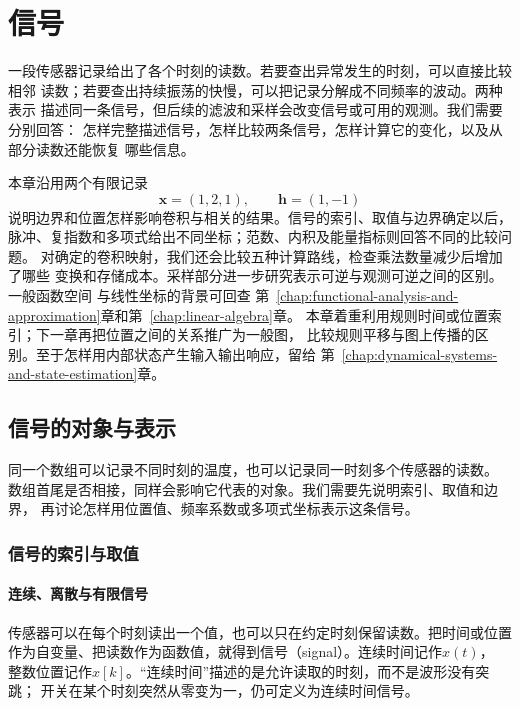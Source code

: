 \chapter{信号}
\label{chap:signal-analysis}

一段传感器记录给出了各个时刻的读数。若要查出异常发生的时刻，可以直接比较相邻
读数；若要查出持续振荡的快慢，可以把记录分解成不同频率的波动。两种表示
描述同一条信号，但后续的滤波和采样会改变信号或可用的观测。我们需要分别回答：
怎样完整描述信号，怎样比较两条信号，怎样计算它的变化，以及从部分读数还能恢复
哪些信息。

本章沿用两个有限记录
\begin{equation}
  \bm x=(1,2,1),\qquad \bm h=(1,-1)
  \label{eq:signal-analysis-running-example}
\end{equation}
说明边界和位置怎样影响卷积与相关的结果。信号的索引、取值与边界确定以后，
脉冲、复指数和多项式给出不同坐标；范数、内积及能量指标则回答不同的比较问题。
对确定的卷积映射，我们还会比较五种计算路线，检查乘法数量减少后增加了哪些
变换和存储成本。采样部分进一步研究表示可逆与观测可逆之间的区别。一般函数空间
与线性坐标的背景可回查
第~\ref{chap:functional-analysis-and-approximation}章和第~\ref{chap:linear-algebra}章。
本章着重利用规则时间或位置索引；下一章再把位置之间的关系推广为一般图，
比较规则平移与图上传播的区别。至于怎样用内部状态产生输入输出响应，留给
第~\ref{chap:dynamical-systems-and-state-estimation}章。

\section{信号的对象与表示}
\label{sec:signal-objects-structure}

同一个数组可以记录不同时刻的温度，也可以记录同一时刻多个传感器的读数。
数组首尾是否相接，同样会影响它代表的对象。我们需要先说明索引、取值和边界，
再讨论怎样用位置值、频率系数或多项式坐标表示这条信号。

\subsection{信号的索引与取值}

\subsubsection{连续、离散与有限信号}

传感器可以在每个时刻读出一个值，也可以只在约定时刻保留读数。把时间或位置
作为自变量、把读数作为函数值，就得到信号（signal）。连续时间记作$x(t)$，
整数位置记作$x[k]$。“连续时间”描述的是允许读取的时刻，而不是波形没有突跳；
开关在某个时刻突然从零变为一，仍可定义为连续时间信号。

